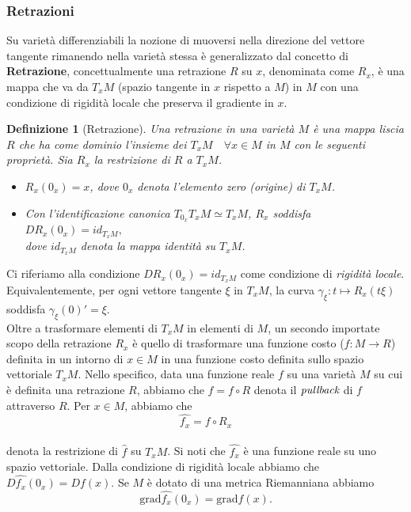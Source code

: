 \documentclass[a4paper, 12pt]{article}
\newtheorem{definition}{Definizione}
\begin{document}
\subsubsection{Retrazioni}
Su varietà differenziabili la nozione di muoversi nella direzione del vettore tangente rimanendo nella varietà stessa è generalizzato dal concetto di \textbf{Retrazione}, concettualmente una retrazione $R$ su $x$, denominata come $R_x$, è una mappa che va da $T_xM$ (spazio tangente in $x$ rispetto a $M$) in $M$ con una condizione di rigidità locale che preserva il gradiente in $x$.
\begin{definition}[Retrazione]
Una retrazione in una varietà $M$ è una mappa liscia $R$ che ha come dominio l'insieme dei $T_xM \quad \forall x \in M$ in $M$ con le seguenti proprietà. Sia $R_x$ la restrizione di $R$ a $T_xM$.
\begin{itemize}
  \item $R_x(0_x) = x$, dove $0_x$ denota l'elemento zero (origine) di $T_xM$.
  \item Con l'identificazione canonica $T_{0_x} T_xM \simeq T_xM$, $R_x$ soddisfa\\
  $DR_x(0_x) = id_{T_xM},$\\
  dove $id_{T_xM}$ denota la mappa identità su $T_xM$.
\end{itemize}
\end{definition}
Ci riferiamo alla condizione $DR_x(0_x) = id_{T_xM}$ come condizione di \emph{rigidità locale}. Equivalentemente, per ogni vettore tangente $\xi$ in $T_xM$, la curva $\gamma_{\xi}:t \mapsto R_x(t\xi)$ soddisfa $\gamma_{\xi}(0)' = \xi$.\\
Oltre a trasformare elementi di $T_xM$ in elementi di $M$, un secondo importate scopo della retrazione $R_x$ è quello di trasformare una funzione costo ($f:M \to R$) definita in un intorno di $x \in M$ in una funzione costo definita sullo spazio vettoriale $T_xM$. Nello specifico, data una funzione reale $f$ su una varietà $M$ su cui è definita una retrazione $R$, abbiamo che $\hat{f} = f \circ R$ denota il $\emph{pullback}$ di $f$ attraverso $R$. Per $x \in M$, abbiamo che\\
\[\hat{f_x} = f \circ R_x\]\\
denota la restrizione di $\hat{f}$ su $T_xM$. Si noti che $\hat{f_x}$ è una funzione reale su uno spazio vettoriale. Dalla condizione di rigidità locale abbiamo che $D\hat{f_x}(0_x) = Df(x)$. Se $M$ è dotato di una metrica Riemanniana abbiamo\\
\[ \mbox{grad} \hat{f_x}(0_x) = \mbox{grad} f(x).\]\\
\end{document}
